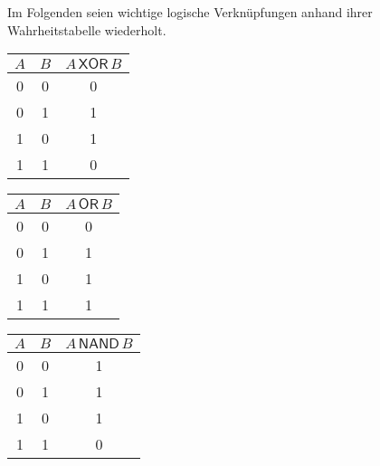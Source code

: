 \begin{exercise}
  Im Folgenden seien wichtige logische Verknüpfungen anhand ihrer
  Wahrheitstabelle wiederholt.
  \begin{center}
    \begin{tabular}{ccc}
      \toprule
      $A$ & $B$ & $A \, \mathsf{XOR} \, B$ \\ \midrule
      0   & 0   & 0                        \\
      0   & 1   & 1                        \\
      1   & 0   & 1                        \\
      1   & 1   & 0                        \\
      \bottomrule
    \end{tabular}
    \begin{tabular}{ccc}
      \toprule
      $A$ & $B$ & $A \, \mathsf{OR} \, B$ \\ \midrule
      0   & 0   & 0                       \\
      0   & 1   & 1                       \\
      1   & 0   & 1                       \\
      1   & 1   & 1                       \\
      \bottomrule
    \end{tabular}
    \begin{tabular}{ccc}
      \toprule
      $A$ & $B$ & $A \, \mathsf{NAND} \, B$ \\ \midrule
      0   & 0   & 1                         \\
      0   & 1   & 1                         \\
      1   & 0   & 1                         \\
      1   & 1   & 0                         \\
      \bottomrule
    \end{tabular}
  \end{center}
\end{exercise}
